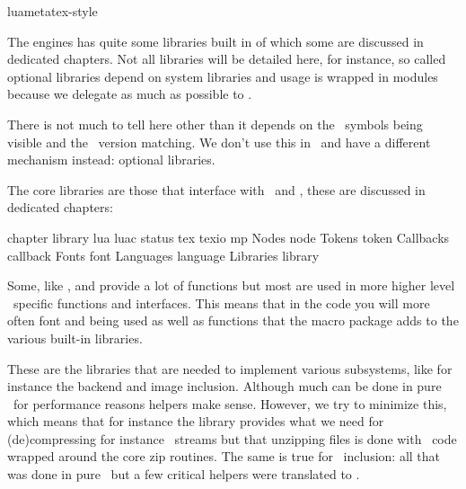 
\environment luametatex-style

\startdocument[title=Libraries]

\startsection[title={Introduction}]

The engines has quite some libraries built in of which some are discussed in
dedicated chapters. Not all libraries will be detailed here, for instance, so
called optional libraries depend on system libraries and usage is wrapped in
modules because we delegate as much as possible to \LUA.

\stopsection

\startsection[title={Third party}]

There is not much to tell here other than it depends on the \LUA\ symbols being
visible and the \LUA\ version matching. We don't use this in \CONTEXT\ and have a
different mechanism instead: optional libraries.

\stopsection

\startsection[title={Core}]

The core libraries are those that interface with \TEX\ and \METAPOST, these are
discussed in dedicated chapters:

\starttabulate[|l|Tl|]
\FL
\BC chapter   \BC library          \NC \NR
\TL
\NC \LUA      \NC lua luac         \NC \NR
\NC \TEX      \NC status tex texio \NC \NR
\NC \METAPOST \NC mp               \NC \NR
\NC Nodes     \NC node             \NC \NR
\NC Tokens    \NC token            \NC \NR
\NC Callbacks \NC callback         \NC \NR
\NC Fonts     \NC font             \NC \NR
\NC Languages \NC language         \NC \NR
\NC Libraries \NC library          \NC \NR
\LL
\stoptabulate

Some, like ,  and  provide a lot of functions
but most are used in more higher level \CONTEXT\ specific functions and
interfaces. This means that in the code you will more often font 
and  being used as well as functions that the macro package adds to
the various built-in libraries.

\stopsection

\startsection[title={Auxiliary}]

\startsubsection[title=Extensions]

These are the libraries that are needed to implement various subsystems, like for
instance the backend and image inclusion. Although much can be done in pure \LUA\
for performance reasons helpers make sense. However, we try to minimize this,
which means that for instance the \type {zip} library provides what we need for
(de)compressing for instance \PDF\ streams but that unzipping files is done with
\LUA\ code wrapped around the core zip routines. The same is true for \PNG\
inclusion: all that was done in pure \LUA\ but a few critical helpers were
translated to \CCODE.

